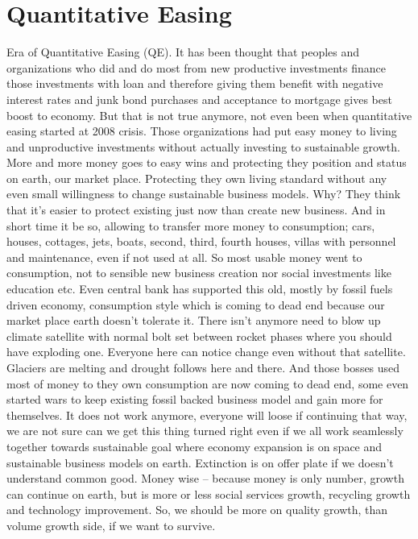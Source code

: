 \section{Quantitative Easing}
Era of Quantitative Easing (QE). It has been thought that peoples and
organizations who did and do most from new productive investments finance
those investments with loan and therefore giving them benefit with negative
interest rates and junk bond purchases and acceptance to mortgage gives best
boost to economy. But that is not true anymore, not even been when
quantitative easing started at 2008 crisis. Those organizations had put easy
money to living and unproductive investments without actually investing to
sustainable growth. More and more money goes to easy wins and protecting they
position and status on earth, our market place. Protecting they own living
standard without any even small willingness to change sustainable business
models. Why? They think that it's easier to protect existing just now than
create new business. And in short time it be so, allowing to transfer more
money to consumption; cars, houses, cottages, jets, boats, second, third,
fourth houses, villas with personnel and maintenance, even if not used at all.
So most usable money went to consumption, not to sensible new business
creation nor social investments like education etc. Even central bank has
supported this old, mostly by fossil fuels driven economy, consumption style
which is coming to dead end because our market place earth doesn't tolerate
it. There isn't anymore need to blow up climate satellite with normal bolt set
between rocket phases where you should have exploding one. Everyone here can
notice change even without that satellite. Glaciers are melting and drought
follows here and there. And those bosses used most of money to they own
consumption are now coming to dead end, some even started wars to keep
existing fossil backed business model and gain more for themselves. It does
not work anymore, everyone will loose if continuing that way, we are not sure
can we get this thing turned right even if we all work seamlessly together
towards sustainable goal where economy expansion is on space and sustainable
business models on earth. Extinction is on offer plate if we doesn't
understand common good. Money wise -- because money is only number, growth
can continue on earth, but is more or less social services growth, recycling
growth and technology improvement. So, we should be more on quality growth,
than volume growth side, if we want to survive.

